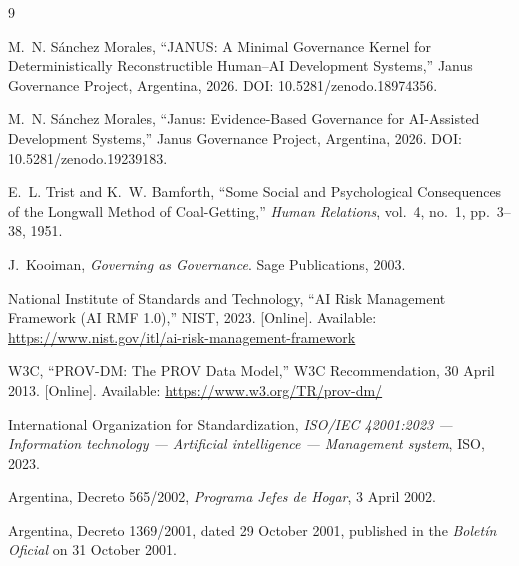 \documentclass[conference]{IEEEtran}
\begin{document}
\begin{thebibliography}{9}

M.~N. Sánchez Morales, ``JANUS: A Minimal Governance Kernel for Deterministically Reconstructible Human--AI Development Systems,'' Janus Governance Project, Argentina, 2026. DOI: 10.5281/zenodo.18974356.

M.~N. Sánchez Morales, ``Janus: Evidence-Based Governance for AI-Assisted Development Systems,'' Janus Governance Project, Argentina, 2026. DOI: 10.5281/zenodo.19239183.

E.~L. Trist and K.~W. Bamforth, ``Some Social and Psychological Consequences of the Longwall Method of Coal-Getting,'' \emph{Human Relations}, vol.~4, no.~1, pp.~3--38, 1951.

J.~Kooiman, \emph{Governing as Governance}. Sage Publications, 2003.

National Institute of Standards and Technology, ``AI Risk Management Framework (AI RMF 1.0),'' NIST, 2023. [Online]. Available: \url{https://www.nist.gov/itl/ai-risk-management-framework}

W3C, ``PROV-DM: The PROV Data Model,'' W3C Recommendation, 30 April 2013. [Online]. Available: \url{https://www.w3.org/TR/prov-dm/}

International Organization for Standardization, \emph{ISO/IEC 42001:2023 --- Information technology --- Artificial intelligence --- Management system}, ISO, 2023.

Argentina, Decreto 565/2002, \emph{Programa Jefes de Hogar}, 3 April 2002.

Argentina, Decreto 1369/2001, dated 29 October 2001, published in the
\emph{Bolet\'in Oficial} on 31 October 2001.

\end{thebibliography}
\end{document}
